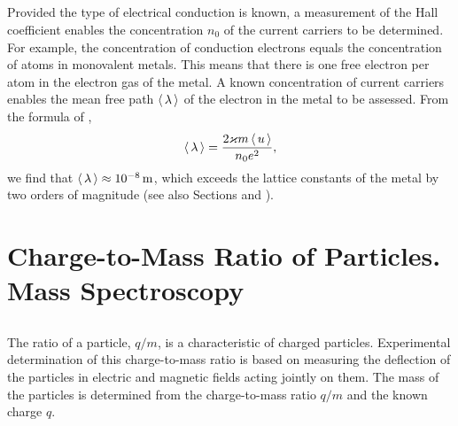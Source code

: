 \subsection{}\label{24.2.4} Provided the type of electrical conduction is known, a measurement of the Hall coefficient enables the concentration $n_{0}$ of the current carriers to be determined. For example, the concentration of conduction electrons equals the concentration of atoms in monovalent metals. This means that there is one free electron per atom in the electron gas  of the metal. A known concentration of current carriers enables the mean free path $\expval{\, \lambda \,}$ of the electron in the metal to be assessed. From the formula of ,
\begin{equation*}%
\expval{\, \lambda \,} = \frac{2 \varkappa m \expval{\, u \,}}{n_{0}e^{2}},
\end{equation*}
we find that $\expval{\, \lambda \,} \approx \SI{d-8}{\meter}$, which exceeds the lattice constants of the metal by two orders of magnitude (see also Sections  and ).




\section{Charge-to-Mass Ratio of Particles. Mass
Spectroscopy}
\label{sec-24.3}

\subsection{}\label{24.3.1} The  ratio of a particle, $q/m$, is a characteristic of charged particles. Experimental determination of this charge-to-mass ratio is based on measuring the deflection of the particles in electric and magnetic fields acting jointly on them. The mass of the particles is determined from the charge-to-mass ratio $q/m$ and the known charge $q$. 


